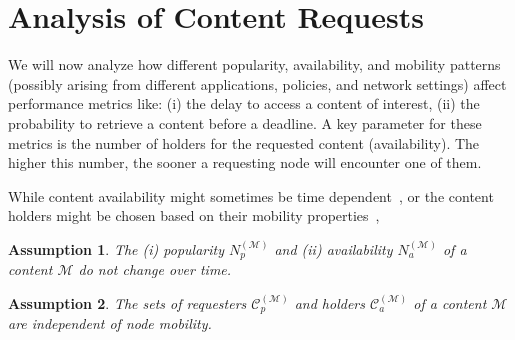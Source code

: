 \documentclass[journal]{IEEEtran}
\newtheorem{assumption}{Assumption}
\newcommand{\Np}{N_{p}^{(\mathcal{M})}}
\newcommand{\Na}{N_{a}^{(\mathcal{M})}}
\newcommand{\Cp}{\mathcal{C}_{p}^{(\mathcal{M})}}
\newcommand{\Ca}{\mathcal{C}_{a}^{(\mathcal{M})}}
\begin{document}
\section{Analysis of Content Requests}\label{sec:analysis}
We will now analyze how different popularity, availability, and mobility patterns (possibly arising from different applications, policies, and network settings) affect performance metrics like: (i) the delay to access a content of interest, (ii) the probability to retrieve a content before a  deadline. A key parameter for these metrics is the number of holders for the requested content (availability). The higher this number, the sooner a requesting node will encounter one of them.  

While content availability might sometimes be time dependent~\cite{CEDO}, or the content holders might be chosen based on their mobility properties~\cite{multiple-offloading}, 

\begin{assumption}\label{ass:availability-time-independence}
The (i) popularity $\Np$ and (ii) availability $\Na$ of a content $\mathcal{M}$ do not change over time.
\end{assumption}

\begin{assumption}\label{ass:traffic-mobility-independence}The sets of requesters $\Cp$ and holders $\Ca$ of a content $\mathcal{M}$ are independent of node mobility.
\end{assumption} 

\end{document}
